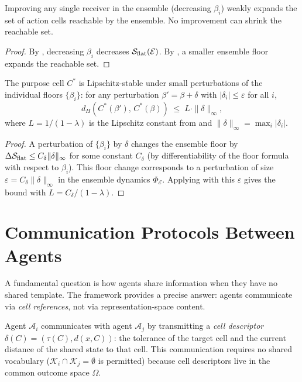 \begin{corollary}
\label{cor:ensemble-improvement}
Improving any single receiver in the ensemble (decreasing $\beta_i$) weakly
expands the set of action cells reachable by the ensemble.  No improvement
can shrink the reachable set.
\end{corollary}

\begin{proof}
By , decreasing $\beta_i$ decreases
$\mathcal{S}_{\mathrm{flat}}(\mathcal{E})$.  By , a
smaller ensemble floor expands the reachable set.
\end{proof}

\begin{theorem}
\label{thm:purpose-belief-stability}
The purpose cell $C^*$ is Lipschitz-stable under small perturbations of the
individual floors $\{\beta_i\}$: for any perturbation $\beta' = \beta + \delta$
with $|\delta_i| \leq \varepsilon$ for all $i$,
\[
  d_H(C^*(\beta'),\, C^*(\beta)) \;\leq\; L \cdot \|\delta\|_\infty ,
\]
where $L = 1/(1-\lambda)$ is the Lipschitz constant from 
and $\|\delta\|_\infty = \max_i |\delta_i|$.
\end{theorem}

\begin{proof}
A perturbation of $\{\beta_i\}$ by $\delta$ changes the ensemble floor by
$\Delta\mathcal{S}_{\mathrm{flat}} \leq C_\delta \|\delta\|_\infty$ for some constant $C_\delta$
(by differentiability of the floor formula with respect to $\beta_i$).  This
floor change corresponds to a perturbation of size $\varepsilon = C_\delta
\|\delta\|_\infty$ in the ensemble dynamics $\Phi_\mathcal{E}$.  Applying
 with this $\varepsilon$ gives the bound with
$L = C_\delta/(1-\lambda)$.
\end{proof}

\section{Communication Protocols Between Agents}
\label{sec:communication-protocols}

A fundamental question is how agents share information when they have no
shared template.  The framework provides a precise answer: agents communicate
via \emph{cell references}, not via representation-space content.

\begin{definition}
\label{def:cell-communication}
Agent $\mathcal{A}_i$ communicates with agent $\mathcal{A}_j$ by transmitting
a \emph{cell descriptor} $\delta(C) = (\tau(C), d(x, C))$: the tolerance of
the target cell and the current distance of the shared state to that cell.
This communication requires no shared vocabulary ($\mathcal{K}_i \cap \mathcal{K}_j =
\emptyset$ is permitted) because cell descriptors live in the common outcome
space $\Omega$.
\end{definition}

